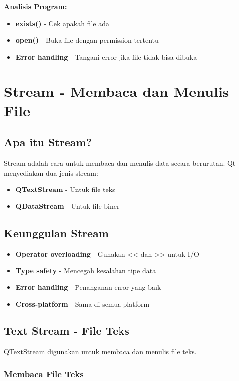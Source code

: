\textbf{Analisis Program:}
\begin{itemize}
\item \textbf{exists()} - Cek apakah file ada
\item \textbf{open()} - Buka file dengan permission tertentu
\item \textbf{Error handling} - Tangani error jika file tidak bisa dibuka
\end{itemize}

\section{Stream - Membaca dan Menulis File}

\subsection{Apa itu Stream?}

Stream adalah cara untuk membaca dan menulis data secara berurutan. Qt menyediakan dua jenis stream:

\begin{itemize}
\item \textbf{QTextStream} - Untuk file teks
\item \textbf{QDataStream} - Untuk file biner
\end{itemize}

\subsection{Keunggulan Stream}

\begin{itemize}
\item \textbf{Operator overloading} - Gunakan << dan >> untuk I/O
\item \textbf{Type safety} - Mencegah kesalahan tipe data
\item \textbf{Error handling} - Penanganan error yang baik
\item \textbf{Cross-platform} - Sama di semua platform
\end{itemize}

\subsection{Text Stream - File Teks}

QTextStream digunakan untuk membaca dan menulis file teks.

\subsubsection{Membaca File Teks}

